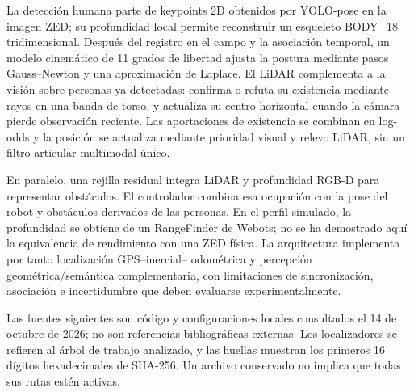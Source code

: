 \documentclass[11pt,a4paper]{article}
\begin{document}
La detección humana parte de keypoints 2D obtenidos por YOLO-pose en la imagen ZED;
su profundidad local permite reconstruir un esqueleto BODY\_18 tridimensional.
Después del registro en el campo y la asociación temporal, un modelo cinemático
de 11 grados de libertad ajusta la postura mediante pasos Gauss--Newton y una
aproximación de Laplace. El LiDAR complementa a la visión sobre personas ya
detectadas: confirma o refuta su existencia mediante rayos en una banda de torso,
y actualiza su centro horizontal cuando la cámara pierde observación reciente.
Las aportaciones de existencia se combinan en log-odds y la posición se actualiza
mediante prioridad visual y relevo LiDAR, sin un filtro articular multimodal único.

En paralelo, una rejilla residual integra LiDAR y profundidad RGB-D para representar
obstáculos. El controlador combina esa ocupación con la pose del robot y obstáculos
derivados de las personas. En el perfil simulado, la profundidad se obtiene de un
RangeFinder de Webots; no se ha demostrado aquí la equivalencia de rendimiento con
una ZED física. La arquitectura implementa por tanto localización GPS--inercial--
odométrica y percepción geométrica/semántica complementaria, con limitaciones de
sincronización, asociación e incertidumbre que deben evaluarse experimentalmente.

\clearpage
Las fuentes siguientes son código y configuraciones locales consultados el 14 de octubre de 2026; no son referencias bibliográficas externas. Los localizadores se refieren al árbol de trabajo analizado, y las huellas muestran los primeros 16 dígitos hexadecimales de SHA-256. Un archivo conservado no implica que todas sus rutas estén activas.
\end{document}
